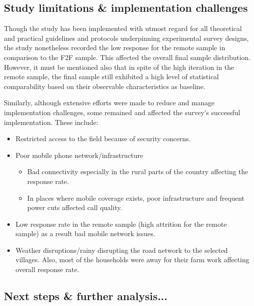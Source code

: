 \documentclass[11pt,harvard]{article}
\begin{document}
	
	
	
	\pagebreak
	
	
	\subsection{Study limitations \& implementation challenges}
	
	Though the study has been implemented with utmost regard for all theoretical and practical guidelines and protocols underpinning experimental survey designs, the study nonetheless recorded the low response for the remote sample in comparison to the F2F sample. This affected the overall final sample distribution. However, it must be mentioned also that in spite of the high iteration in the remote sample, the final sample still exhibited a high level of statistical comparability based on their observable characteristics as baseline.
	
	
	Similarly, although extensive efforts were made to reduce and manage implementation challenges, some remained and affected the survey's successful implementation. These include:
	
	\begin{itemize}[label=--, left=2.5em]
		\item[1.] Restricted access to the field because of security concerns.
		\item[2.] Poor mobile phone network/infrastructure 
		\begin{itemize}[label=--, left=1.75em]
			\item[a.]	Bad connectivity especially in the rural parts of the country affecting the response rate.
			\item[b.]	In places where mobile coverage exists, poor infrastructure and frequent power cuts affected call quality.
		\end{itemize}
		\item[3.] Low response rate in the remote sample (high attrition for the remote sample) as a result bad mobile network issues.
		\item[4.] Weather disruptions/rainy disrupting the road network to the selected villages. Also, most of the households were away for their farm work affecting overall response rate.
	\end{itemize}
	
	
	\subsection{Next steps \& further analysis...}
	
\end{document}
